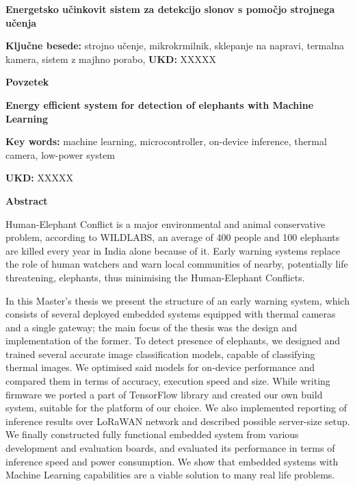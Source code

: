 \begin{poglavje}
\noindent\bfseries Energetsko učinkovit sistem za detekcijo slonov s pomočjo strojnega učenja
\end{poglavje}

\bigskip
\bigskip
\bigskip
\bigskip
\bigskip
\textbf{Ključne besede:} strojno učenje, mikrokrmilnik, sklepanje na napravi, termalna kamera, sistem z majhno porabo, 
\bigskip
\textbf{UKD:} XXXXX

\bigskip
\bigskip
\bigskip
\bigskip
\textbf{Povzetek}

\lipsum[1-5]
\newpage

\begin{poglavje}
\noindent\bfseries Energy efficient system for detection of elephants with Machine Learning
\end{poglavje}

\bigskip
\bigskip
\bigskip
\bigskip
\bigskip
\textbf{Key words:} machine learning, microcontroller, on-device inference, thermal camera, low-power system

\bigskip
\textbf{UKD:} XXXXX

\bigskip
\bigskip
\bigskip
\bigskip
\textbf{Abstract}

Human-Elephant Conflict is a major environmental and animal conservative problem, according to WILDLABS, an average of 400 people and 100 elephants are killed every year in India alone because of it. 
Early warning systems replace the role of human watchers and warn local communities of nearby, potentially life threatening, elephants, thus minimising the Human-Elephant Conflicts.

In this Master's thesis we present the structure of an early warning system, which consists of several deployed embedded systems equipped with thermal cameras and a single gateway; the main focus of the thesis was the design and implementation of the former.
To detect presence of elephants, we designed and trained several accurate image classification models, capable of classifying thermal images.
We optimised said models for on-device performance and compared them in terms of accuracy, execution speed and size.
While writing firmware we ported a part of TensorFlow library and created our own build system, suitable for the platform of our choice. 
We also implemented reporting of inference results over LoRaWAN network and described possible server-size setup.
We finally constructed fully functional embedded system from various development and evaluation boards, and evaluated its performance in terms of inference speed and power consumption.
We show that embedded systems with Machine Learning capabilities are a viable solution to many real life problems.
\newpage
